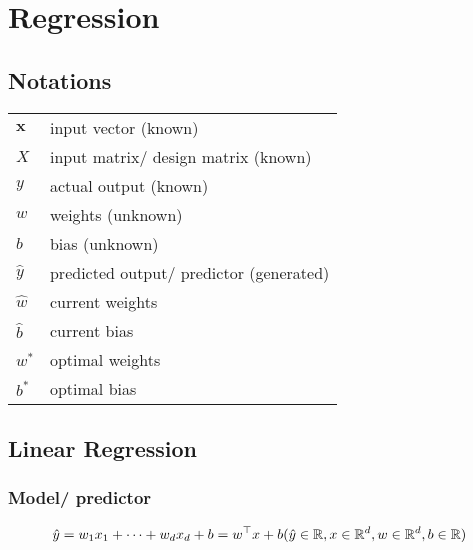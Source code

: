 \chapter{Regression}

\section*{Notations}

\begin{alternateColorTable}
\renewcommand{\arraystretch}{1.3}
\begin{table}[H]
    \begin{tabular}{l l}
        $\mathbf{x}$ & input vector (known) \\

        $X$ & input matrix/ design matrix (known) \\
        
        $y$ & actual output (known) \\

        $w$ & weights (unknown) \\

        $b$ & bias (unknown) \\

        $\hat{y}$ & predicted output/ predictor (generated) \\

        $\hat{w}$ & current weights \\

        $\hat{b}$ & current bias \\

        $w^\ast$ & optimal weights \\

        $b^\ast$ & optimal bias \\
    \end{tabular}
\end{table}
\renewcommand{\arraystretch}{1}
\end{alternateColorTable}

\section{Linear Regression \cite{dnn-1}} \label{Linear Regression}

\subsection{Model/ predictor \cite{dnn-1}}
\[
    \hfill
    \hat{y} = w_1x_1 + \cdots + w_dx_d + b
    = w^\top x + b
    \hfill
    (
        \hat{y} \in \mathbb{R},
        x \in \mathbb{R}^d ,
        w \in \mathbb{R}^d,
        b \in \mathbb{R}
    )
\]
    

